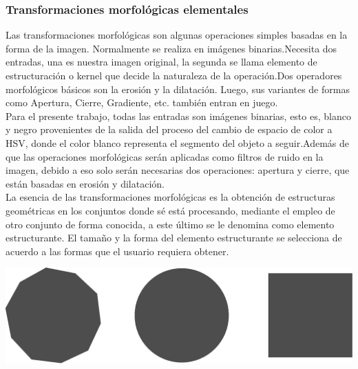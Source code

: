 \subsubsection{Transformaciones morfológicas elementales}
Las transformaciones morfológicas son algunas operaciones simples basadas en la forma de la imagen. Normalmente se realiza en
imágenes binarias.Necesita dos entradas, una es nuestra imagen original, la segunda se llama elemento de estructuración o
kernel que decide la naturaleza de la operación.Dos operadores morfológicos básicos son la erosión y la dilatación. Luego,
sus variantes de formas como Apertura, Cierre, Gradiente, etc. también entran en juego. \cite{WEB:Ieeeucsa2019}\\
Para el presente trabajo, todas las entradas son imágenes binarias, esto es, blanco y negro provenientes de la salida
del proceso del cambio de espacio de color a HSV, donde el color blanco representa el segmento del objeto a seguir.Además de que
las operaciones morfológicas serán aplicadas como filtros de ruido en la imagen, debido a eso solo serán necesarias dos operaciones:
apertura y cierre, que están basadas en erosión y dilatación.\\
La esencia de las transformaciones morfológicas es la obtención de estructuras geométricas en los conjuntos donde sé está procesando,
mediante el empleo de otro conjunto de forma conocida, a este último se le denomina como elemento estructurante.
El tamaño y la forma del elemento estructurante se selecciona de acuerdo a las formas que el usuario requiera obtener.
\begin{center}
	\includegraphics[width=0.5 \textwidth]{Contenido/Cuerpo/Capitulo2/Fig13.eps}
	\label{fig:MarcoTeorico:Fig22}
\end{center}


